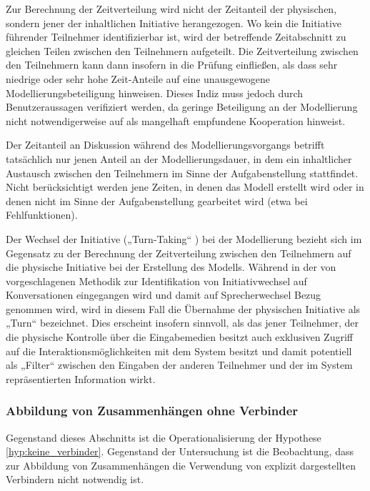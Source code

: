 Zur Berechnung der Zeitverteilung wird nicht der Zeitanteil der physischen, sondern jener der inhaltlichen Initiative herangezogen. Wo kein die Initiative führender Teilnehmer identifizierbar ist, wird der betreffende Zeitabschnitt zu gleichen Teilen zwischen den Teilnehmern aufgeteilt. Die Zeitverteilung zwischen den Teilnehmern kann dann insofern in die Prüfung einfließen, als dass sehr niedrige oder sehr hohe Zeit-Anteile auf eine unausgewogene Modellierungsbeteiligung hinweisen. Dieses Indiz muss jedoch durch Benutzeraussagen verifiziert werden, da geringe Beteiligung an der Modellierung nicht notwendigerweise auf als mangelhaft empfundene Kooperation hinweist.

Der Zeitanteil an Diskussion während des Modellierungsvorgangs betrifft tatsächlich nur jenen Anteil an der Modellierungsdauer, in dem ein inhaltlicher Austausch zwischen den Teilnehmern im Sinne der Aufgabenstellung stattfindet. Nicht berücksichtigt werden jene Zeiten, in denen das Modell erstellt wird oder in denen nicht im Sinne der Aufgabenstellung gearbeitet wird (etwa bei Fehlfunktionen).

Der Wechsel der Initiative („Turn-Taking“ \citep{Sacks74}) bei der Modellierung bezieht sich im Gegensatz zu der Berechnung der Zeitverteilung zwischen den Teilnehmern auf die physische Initiative bei der Erstellung des Modells. Während in der von \citet{Sacks74} vorgeschlagenen Methodik zur Identifikation von Initiativwechsel auf Konversationen eingegangen wird und damit auf Sprecherwechsel Bezug genommen wird, wird in diesem Fall die Übernahme der physischen Initiative als „Turn“ bezeichnet. Dies erscheint insofern sinnvoll, als das jener Teilnehmer, der die physische Kontrolle über die Eingabemedien besitzt auch exklusiven Zugriff auf die Interaktionsmöglichkeiten mit dem System besitzt und damit potentiell als „Filter“ zwischen den Eingaben der anderen Teilnehmer und der im System repräsentierten Information wirkt.


\subsubsection{Abbildung von Zusammenhängen ohne Verbinder} %
\label{ssub:abbildung_von_zusammenhängen_ohne_verbinder}

Gegenstand dieses Abschnitts ist die Operationalisierung der Hypothese \ref{hyp:keine_verbinder}. Gegenstand der Untersuchung ist die Beobachtung, dass zur Abbildung von Zusammenhängen die Verwendung von explizit dargestellten Verbindern nicht notwendig ist.

